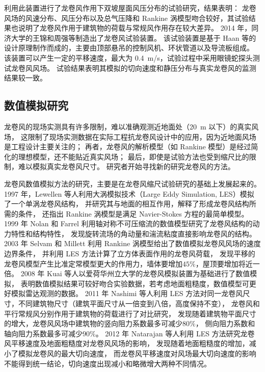 利用此装置进行了龙卷风作用下双坡屋面风压分布的试验研究，结果表明：
龙卷风场的风速分布、风压分布以及总气压降和 Rankine 涡模型吻合较好，其试验结果也说明了龙卷风作用于建筑物的荷载与常规风作用存在较大差异。
2014 年，同济大学的王锦和周强等\cite{wang2014tornado}制造出了龙卷风试验装置。
该试验装置是基于 Haan 等的设计原理制作而成的，主要由顶部悬吊的控制风机、环状管道以及导流板组成。
该装置可以产生一定的平移速度，最大为 \SI{0.4}{m/s}，试验过程中采用眼镜蛇探头测试龙卷风风场。
试验结果表明其模拟的切向速度和静压分布与真实龙卷风的监测结果较一致。

\subsection{数值模拟研究}
龙卷风的现场实测具有许多限制，难以准确观测近地面处（\SI{20}{m} 以下）的真实风场，
这限制了现场实测数据在实际工程抗龙卷风设计中的应用，因为近地面风场是工程设计主要关注的；
再者，龙卷风的解析模型（如 Rankine 模型）是经过简化的理想模型，还不能贴近真实风场；
最后，即使是试验方法也受到缩尺比的限制，难以模拟真实龙卷风尺寸。
研究者开始寻找新的研究龙卷风的方法。

龙卷风数值模拟方法的研究，主要是在龙卷风缩尺试验研究的基础上发展起来的。
1997 年，Lewellen 等人\cite{lewellen1997large}利用大涡模拟技术（Large Eddy Simulation, LES）模拟了一个单涡龙卷风结构，
并研究其与地面的相互作用，解释了形成龙卷风结构所需的条件，
还指出 Rankine 涡模型是满足 Navier-Stokes 方程的最简单模型。
1999 年 Nolan 和 Farrel \cite{nolan1999structure}利用轴对称不可压缩流的数值模型研究了龙卷风结构的动力特性和结构特性，
发现旋转流场的角动量和湍流粘度直接影响龙卷风的结构。
2003 年 Selvam 和 Millett \cite{selvam2003computer}利用 Rankine 涡模型给出了数值模拟龙卷风风场的速度边界条件，
并利用 LES 方法计算了立方体表面作用的龙卷风荷载，
发现平移的龙卷风模型产生比准定常模型更大的作用力，墙体要增加$45\%$，屋顶要增加将近一倍。
2008 年 Kuai 等人\cite{kuai2008cfd}以爱荷华州立大学的龙卷风模拟装置为基础进行了数值模拟，
表明数值模拟结果可较好吻合实验数据，若考虑地面粗糙度，数值模型可更好模拟雷达观测的数据。
2011 年 Nashimi 等人\cite{alrasheedi2011computing}利用 LES 方法对同一龙卷风尺寸，不同建筑物尺寸（建筑平面尺寸从一倍变到八倍，高度保持不变），
龙卷风和平行常规风分别作用于建筑物的荷载进行了对比研究，
发现随着建筑物平面尺寸的增大，龙卷风风场中建筑物的竖向阻力系数最多可减少$80\%$，
侧向阻力系数和轴向阻力系数最多可减少$90\%$。
2012 年 Natarajan 等人\cite{natarajan2012large}利用 LES 方法研究龙卷风平移速度及地面粗糙度对龙卷风风场的影响，
发现随着地面粗糙度的增加，减小了模拟龙卷风的最大切向速度，
而龙卷风平移速度对风场最大切向速度的影响不能得到统一结论，切向速度出现减小和略微增大两种不同情况。

